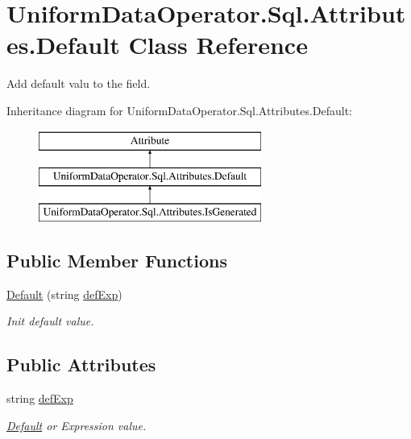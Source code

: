 \hypertarget{class_uniform_data_operator_1_1_sql_1_1_attributes_1_1_default}{}\section{Uniform\+Data\+Operator.\+Sql.\+Attributes.\+Default Class Reference}
\label{class_uniform_data_operator_1_1_sql_1_1_attributes_1_1_default}


Add default valu to the field.  


Inheritance diagram for Uniform\+Data\+Operator.\+Sql.\+Attributes.\+Default\+:\begin{figure}[H]
\begin{center}
\leavevmode
\includegraphics[height=3.000000cm]{d6/df9/class_uniform_data_operator_1_1_sql_1_1_attributes_1_1_default}
\end{center}
\end{figure}
\subsection*{Public Member Functions}
\begin{DoxyCompactItemize}
\item 
\mbox{\hyperlink{class_uniform_data_operator_1_1_sql_1_1_attributes_1_1_default_a9b6f3f42eccfc683466b3b8740e57212}{Default}} (string \mbox{\hyperlink{class_uniform_data_operator_1_1_sql_1_1_attributes_1_1_default_a1ba564b7f35af4395bafa39d6f5f69dc}{def\+Exp}})
\begin{DoxyCompactList}\small\item\em Init default value. \end{DoxyCompactList}\end{DoxyCompactItemize}
\subsection*{Public Attributes}
\begin{DoxyCompactItemize}
\item 
string \mbox{\hyperlink{class_uniform_data_operator_1_1_sql_1_1_attributes_1_1_default_a1ba564b7f35af4395bafa39d6f5f69dc}{def\+Exp}}
\begin{DoxyCompactList}\small\item\em \mbox{\hyperlink{class_uniform_data_operator_1_1_sql_1_1_attributes_1_1_default}{Default}} or Expression value. \end{DoxyCompactList}\end{DoxyCompactItemize}



